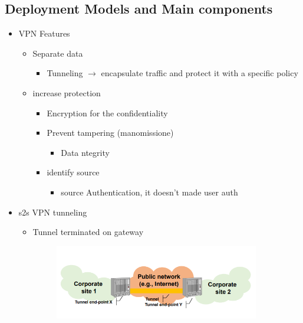 \documentclass{article}
\begin{document}
\subsection{Deployment Models and Main components}
\begin{itemize}
    \item VPN Features
    \begin{itemize}
        \item Separate data
        \begin{itemize}
            \item Tunneling $\rightarrow$ encapsulate traffic and protect it with a specific policy
        \end{itemize}
        \item increase protection
        \begin{itemize}
            \item Encryption for the confidentiality
        \end{itemize}
        \begin{itemize}
            \item Prevent tampering (manomissione)
            \begin{itemize}
                \item Data ntegrity
            \end{itemize}
            \item identify source
            \begin{itemize}
                \item source Authentication, it doesn't made user auth
            \end{itemize}
        \end{itemize}
    \end{itemize}
    \item s2s VPN tunneling
    \begin{itemize}
        \item Tunnel terminated on gateway
        \begin{figure}[H]
            \centering
            \includegraphics[width=0.90\textwidth]{figure/s2s.png}

\end{figure}
\end{itemize}
\end{itemize}
\end{document}
